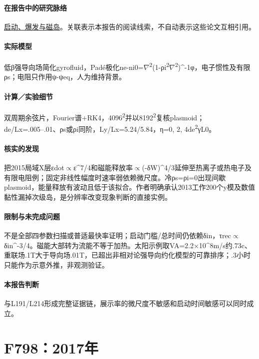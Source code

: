 \documentclass[UTF8,a4paper,11pt,openany,fontset=fandol]{ctexbook}
\begin{document}
\paragraph{在报告中的研究脉络}\hyperref[story:onset]{启动、爆发与磁岛}。关联表示本报告的阅读线索，不自动表示这些论文互相引用。

\paragraph{实际模型}低β强导向场简化gyrofluid，Padé极化ne-ni0=\ensuremath{\nabla}\textsuperscript{2}(1-ρi\textsuperscript{2}\ensuremath{\nabla}\textsuperscript{2})\textasciicircum{}-1φ，电子惯性及有限ρs；电阻只作用ψ-ψeq，人为维持背景。

\paragraph{计算／实验细节}双周期余弦片，Fourier谱+RK4，4096\textsuperscript{2}并以8192\textsuperscript{2}复核plasmoid；de/Lx=.005–.01、ρs或ρi同阶，Ly/Lx=5.24/5.84，η=0, 2, 4de\textsuperscript{2}γL0。

\paragraph{核实的发现}把2015局域X层εdot\ensuremath{\propto}ε\textasciicircum{}7/4和磁能释放率\ensuremath{\propto}(-δW)\textasciicircum{}4/3延伸至热离子或热电子及有限电阻例；固定非线性幅度时速率弱依赖微尺度。冷ρs=ρi=0出现间歇plasmoid，能量释放有波动且低于该拟合。作者明确承认2013工作200个y模及数值黏性漏掉次级岛，是分辨率改变现象判断的直接实例。

\paragraph{限制与未完成问题}不是全部四参数扫描或普适最快率证明；启动门槛/总时间仍依赖δin，τrec\ensuremath{\propto}δin\textasciicircum{}-3/4。磁能大部转为流能不等于加热。太阳示例取VA=2.2×10\textasciicircum{}8m/s约.73c、重联场.1T大于导向场.01T，已超出非相对论强导向约化模型的可靠排序；.3小时只能作为示意外推，非观测验证。

\paragraph{本报告判断}与L191/L214形成完整证据链，展示率的微尺度不敏感和启动时间敏感可以同时成立。

\section{F798：2017年}\label{paper:F798}
\end{document}
